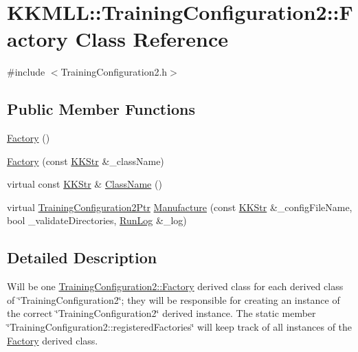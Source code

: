 \hypertarget{class_k_k_m_l_l_1_1_training_configuration2_1_1_factory}{}\section{K\+K\+M\+LL\+:\+:Training\+Configuration2\+:\+:Factory Class Reference}
\label{class_k_k_m_l_l_1_1_training_configuration2_1_1_factory}


{\ttfamily \#include $<$Training\+Configuration2.\+h$>$}

\subsection*{Public Member Functions}
\begin{DoxyCompactItemize}
\item 
\hyperlink{class_k_k_m_l_l_1_1_training_configuration2_1_1_factory_ac657a67182372087cd5539d9c8121f37}{Factory} ()
\item 
\hyperlink{class_k_k_m_l_l_1_1_training_configuration2_1_1_factory_ab736d64caca7a8d8c65005dc56731dfd}{Factory} (const \hyperlink{class_k_k_b_1_1_k_k_str}{K\+K\+Str} \&\+\_\+class\+Name)
\item 
virtual const \hyperlink{class_k_k_b_1_1_k_k_str}{K\+K\+Str} \& \hyperlink{class_k_k_m_l_l_1_1_training_configuration2_1_1_factory_adb04367d56191dc110439049ad32a724}{Class\+Name} ()
\item 
virtual \hyperlink{class_k_k_m_l_l_1_1_training_configuration2_a16dd529d03718630f6f58f572e9535f8}{Training\+Configuration2\+Ptr} \hyperlink{class_k_k_m_l_l_1_1_training_configuration2_1_1_factory_a731316c7a57a388d339830db265571c8}{Manufacture} (const \hyperlink{class_k_k_b_1_1_k_k_str}{K\+K\+Str} \&\+\_\+config\+File\+Name, bool \+\_\+validate\+Directories, \hyperlink{class_k_k_b_1_1_run_log}{Run\+Log} \&\+\_\+log)
\end{DoxyCompactItemize}


\subsection{Detailed Description}
Will be one \hyperlink{class_k_k_m_l_l_1_1_training_configuration2_1_1_factory}{Training\+Configuration2\+::\+Factory} derived class for each derived class of \char`\"{}\+Training\+Configuration2\char`\"{}; they will be responsible for creating an instance of the correct \char`\"{}\+Training\+Configuration2\char`\"{} derived instance. The static member \char`\"{}\+Training\+Configuration2\+::registered\+Factories\char`\"{} will keep track of all instances of the \hyperlink{class_k_k_m_l_l_1_1_training_configuration2_1_1_factory}{Factory} derived class. 

